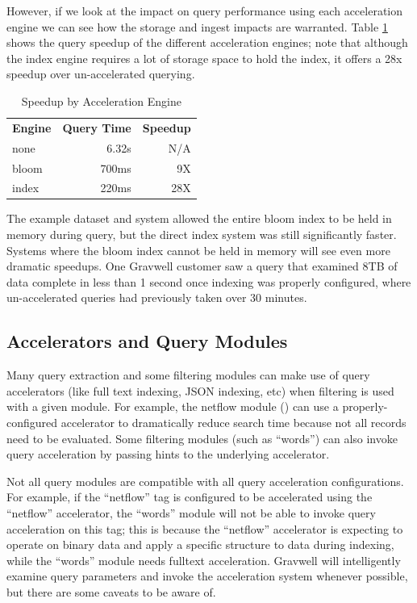 {However, if we look at the impact on query performance using each
acceleration engine we can see how the storage and ingest impacts are
warranted. Table \ref{table:accel-speedup} shows the query speedup of
the different acceleration engines; note that although the index engine
requires a lot of storage space to hold the index, it offers a 28x speedup
over un-accelerated querying.

\begin{table}
\begin{tabular}{lrr}
	\hline
	\textbf{Engine} & \textbf{Query Time} & \textbf{Speedup} \\
	none & 6.32s & N/A \\
	bloom & 700ms & 9X \\
	index & 220ms & 28X \\
	\hline
\end{tabular}
\caption{Speedup by Acceleration Engine}
\label{table:accel-speedup}
\end{table}

The example dataset and system allowed the entire bloom index to be
held in memory during query, but the direct index system was still
significantly faster. Systems where the bloom index cannot be held in
memory will see even more dramatic speedups. One Gravwell customer saw
a query that examined 8TB of data complete in
less than 1 second once indexing was properly configured, where un-accelerated queries
had previously taken over 30 minutes.

\subsection{Accelerators and Query Modules}

Many query extraction and some filtering modules can make use of query accelerators (like full text indexing, JSON indexing, etc) when filtering is used with a given module. For example, the netflow module () can use a properly-configured accelerator to dramatically reduce search time because not all records need to be evaluated.  Some filtering modules (such as ``words'') can also invoke query acceleration by passing hints to the underlying accelerator.

Not all query modules are compatible with all query acceleration configurations.  For example, if the ``netflow'' tag is configured to be accelerated using the ``netflow'' accelerator, the ``words'' module will not be able to invoke query acceleration on this tag; this is because the ``netflow'' accelerator is expecting to operate on binary data and apply a specific structure to data during indexing, while the ``words'' module needs fulltext acceleration.  Gravwell will intelligently examine query parameters and invoke the acceleration system whenever possible, but there are some caveats to be aware of.

}
